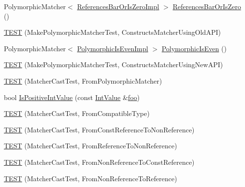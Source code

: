 \begin{DoxyCompactItemize}
\item 
Polymorphic\+Matcher$<$ \mbox{\hyperlink{classtesting_1_1gmock__matchers__test_1_1ReferencesBarOrIsZeroImpl}{References\+Bar\+Or\+Is\+Zero\+Impl}} $>$ \mbox{\hyperlink{namespacetesting_1_1gmock__matchers__test_ac07376a5dff45a905b7eb96e621ce3aa}{References\+Bar\+Or\+Is\+Zero}} ()
\item 
\mbox{\hyperlink{namespacetesting_1_1gmock__matchers__test_aad0604e47fea147ae133d134b4606a26}{T\+E\+ST}} (Make\+Polymorphic\+Matcher\+Test, Constructs\+Matcher\+Using\+Old\+A\+PI)
\item 
Polymorphic\+Matcher$<$ \mbox{\hyperlink{classtesting_1_1gmock__matchers__test_1_1PolymorphicIsEvenImpl}{Polymorphic\+Is\+Even\+Impl}} $>$ \mbox{\hyperlink{namespacetesting_1_1gmock__matchers__test_a8a0035a0de2d219d89ff7070762ece72}{Polymorphic\+Is\+Even}} ()
\item 
\mbox{\hyperlink{namespacetesting_1_1gmock__matchers__test_a619d872aa86419c5093327f64c466df3}{T\+E\+ST}} (Make\+Polymorphic\+Matcher\+Test, Constructs\+Matcher\+Using\+New\+A\+PI)
\item 
\mbox{\hyperlink{namespacetesting_1_1gmock__matchers__test_afffaa6f2c436edb7c46e7a16ed2de825}{T\+E\+ST}} (Matcher\+Cast\+Test, From\+Polymorphic\+Matcher)
\item 
bool \mbox{\hyperlink{namespacetesting_1_1gmock__matchers__test_a68565741c989968637db5a9e10e55020}{Is\+Positive\+Int\+Value}} (const \mbox{\hyperlink{classtesting_1_1gmock__matchers__test_1_1IntValue}{Int\+Value}} \&\mbox{\hyperlink{namespacetesting_1_1gmock__matchers__test_a3536e68112ffbb1f76887cd15bb45c15}{foo}})
\item 
\mbox{\hyperlink{namespacetesting_1_1gmock__matchers__test_aa7a28536a6c59d56bbbbdb4fa5ba9e4d}{T\+E\+ST}} (Matcher\+Cast\+Test, From\+Compatible\+Type)
\item 
\mbox{\hyperlink{namespacetesting_1_1gmock__matchers__test_a9d25aac0defd9296bf207cacd342aff0}{T\+E\+ST}} (Matcher\+Cast\+Test, From\+Const\+Reference\+To\+Non\+Reference)
\item 
\mbox{\hyperlink{namespacetesting_1_1gmock__matchers__test_a4bb3955a1e0b603c0156c98a2dc49eea}{T\+E\+ST}} (Matcher\+Cast\+Test, From\+Reference\+To\+Non\+Reference)
\item 
\mbox{\hyperlink{namespacetesting_1_1gmock__matchers__test_a6fd48b8275f96d9d4ee840f0ec590fb1}{T\+E\+ST}} (Matcher\+Cast\+Test, From\+Non\+Reference\+To\+Const\+Reference)
\item 
\mbox{\hyperlink{namespacetesting_1_1gmock__matchers__test_ab8d3174b8f1ab799906938ed9984643b}{T\+E\+ST}} (Matcher\+Cast\+Test, From\+Non\+Reference\+To\+Reference)

\end{DoxyCompactItemize}
